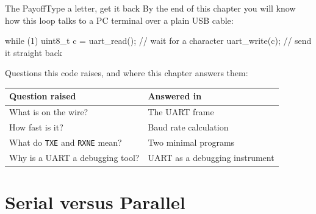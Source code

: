 \documentclass[9pt,aspectratio=169,xcolor=table]{beamer}
\begin{document}
{\beamerextras
\begin{frame}[fragile]{The Payoff}{Type a letter, get it back}
    \leavevmode
    By the end of this chapter you will know how this loop talks to a PC terminal over a plain USB cable:

    \vspace{2mm}
    \begin{center}
    \begin{minipage}{.9\textwidth}
\begin{cc}[basicstyle=\ttfamily\small]
while (1) {
    uint8_t c = uart_read();   // wait for a character
    uart_write(c);             // send it straight back
}
\end{cc}
    \end{minipage}
    \end{center}

    \vspace{2mm}
    {\small Questions this code raises, and where this chapter answers them:}

    \vspace{1mm}
    \begin{center}
    {\small
    \striped
    \begin{tabular}{@{}l R{.52\textwidth}@{}}
        \toprule
        \textbf{Question raised} & \textbf{Answered in} \\
        \midrule
        What is on the wire? & The UART frame \\
        How fast is it? & Baud rate calculation \\
        What do \texttt{TXE} and \texttt{RXNE} mean? & Two minimal programs \\
        Why is a UART a debugging tool? & UART as a debugging instrument \\
        \bottomrule
    \end{tabular}}
    \end{center}
\end{frame}
}


\section{Serial versus Parallel}
\end{document}
